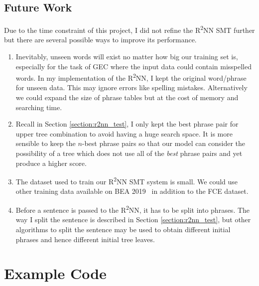 \documentclass[12pt,a4paper,twoside]{report}
\begin{document}
\section{Future Work}
Due to the time constraint of this project, I did not refine the R\textsuperscript{2}NN SMT further but there are several possible ways to improve its performance.

\begin{enumerate}
    \item Inevitably, unseen words will exist no matter how big our training set is, especially for the task of GEC where the input data could contain misspelled words. In my implementation of the R\textsuperscript{2}NN, I kept the original word/phrase for unseen data. This may ignore errors like spelling mistakes. Alternatively we could expand the size of phrase tables but at the cost of memory and searching time.

    \item Recall in Section \ref{section:r2nn_test}, I only kept the best phrase pair for upper tree combination to avoid having a huge search space. It is more sensible to keep the $n$-best phrase pairs so that our model can consider the possibility of a tree which does not use all of the \textit{best} phrase pairs and yet produce a higher score.

    \item The dataset used to train our R\textsuperscript{2}NN SMT system is small. We could use other training data available on BEA 2019~\cite{bryant-etal-2019-bea} in addition to the FCE dataset.

    \item Before a sentence is passed to the R\textsuperscript{2}NN, it has to be split into phrases. The way I split the sentence is described in Section \ref{section:r2nn_test}, but other algorithms to split the sentence may be used to obtain different initial phrases and hence different initial tree leaves.
\end{enumerate}




\appendix


\chapter{Example Code}\label{appendix:code}
\end{document}
